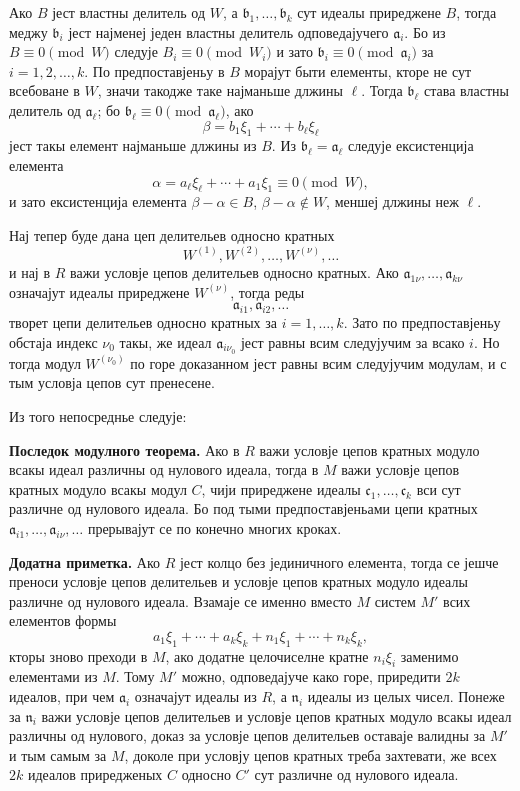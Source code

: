 ﻿\documentclass[11pt]{article}
\begin{document}
Ако $B$ јест властны делитель од $W$, а $\mathfrak b_1,\ldots,\mathfrak b_k$ сут идеалы приреджене $B$, тогда меджу $\mathfrak b_i$ јест најменеј једен властны делитель одповедајучего $\mathfrak a_i$. Бо из $B\equiv0\pmod W$ следује $B_i\equiv0\pmod {W_i}$ и зато $\mathfrak b_i\equiv0\pmod{\mathfrak a_i}$ за $i=1,2,\ldots,k$. По предпоставјеньу в $B$ морајут быти елементы, кторе не сут всебоване в $W$, значи такодже таке најманьше длжины $\ell$. Тогда $\mathfrak b_\ell$ става властны делитель од $\mathfrak a_\ell$; бо $\mathfrak b_\ell\equiv0\pmod{\mathfrak a_\ell}$, ако
\[
        \beta=b_1\xi_1+\cdots+b_\ell\xi_\ell
\]
јест такы елемент најманьше длжины из $B$. Из $\mathfrak b_\ell=\mathfrak a_\ell$ следује ексистенција елемента
\[
        \alpha=a_\ell\xi_\ell+\cdots+a_1\xi_1\equiv0\pmod W,
\]
и зато ексистенција елемента $\beta-\alpha\in B$, $\beta-\alpha\notin W$, меншеј длжины неж $\ell$.

Нај тепер буде дана цеп делительев односно кратных
\[
        W^{(1)},W^{(2)},\ldots,W^{(\nu)},\ldots
\]
и нај в $R$ важи условје цепов делительев односно кратных. Ако $\mathfrak a_{1\nu},\ldots,\mathfrak a_{k\nu}$ означајут идеалы приреджене $W^{(\nu)}$, тогда реды
\[
        \mathfrak a_{i1},\mathfrak a_{i2},\ldots
\]
творет цепи делительев односно кратных за $i=1,\ldots,k$. Зато по предпоставјеньу обстаја индекс $\nu_0$ такы, же идеал $\mathfrak a_{i\nu_0}$ јест равны всим следујучим за всако $i$. Но тогда модул $W^{(\nu_0)}$ по горе доказанном јест равны всим следујучим модулам, и с тым условја цепов сут пренесене.

Из того непосреднье следује:

\medskip
\noindent\textbf{Последок модулного теорема.} Ако в $R$ важи условје цепов кратных модуло всакы идеал различны од нулового идеала, тогда в $M$ важи условје цепов кратных модуло всакы модул $C$, чији приреджене идеалы $\mathfrak c_1,\ldots,\mathfrak c_k$ вси сут различне од нулового идеала. Бо под тыми предпоставјеньами цепи кратных $\mathfrak a_{i1},\ldots,\mathfrak a_{i\nu},\ldots$ прерывајут се по конечно многих кроках.

\medskip
\noindent\textbf{Додатна приметка.} Ако $R$ јест колцо без јединичного елемента, тогда се јешче преноси условје цепов делительев и условје цепов кратных модуло идеалы различне од нулового идеала. Взамаје се именно вместо $M$ систем $M'$ всих елементов формы
\[
        a_1\xi_1+\cdots+a_k\xi_k+n_1\xi_1+\cdots+n_k\xi_k,
\]
кторы зново преходи в $M$, ако додатне целочиселне кратне $n_i\xi_i$ заменимо елементами из $M$. Тому $M'$ можно, одповедајуче како горе, приредити $2k$ идеалов, при чем $\mathfrak a_i$ означајут идеалы из $R$, а $\mathfrak n_i$ идеалы из целых чисел. Понеже за $\mathfrak n_i$ важи условје цепов делительев и условје цепов кратных модуло всакы идеал различны од нулового, доказ за условје цепов делительев оставаје валидны за $M'$ и тым самым за $M$, доколе при условју цепов кратных треба захтевати, же всех $2k$ идеалов приредженых $C$ односно $C'$ сут различне од нулового идеала.
\end{document}
